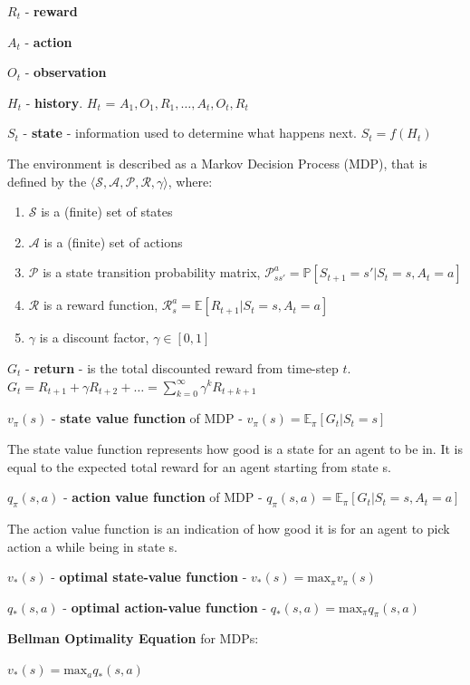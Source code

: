 $R_t$ - \textbf{reward}

$A_t$ - \textbf{action}

$O_t$ - \textbf{observation}

$H_t$ - \textbf{history}. $H_t$ = $A_1,O_1,R_1,\dots,A_t,O_t,R_t$

$S_t$ - \textbf{state} - information used to determine what happens next. $S_t = f(H_t)$

The environment is described as a Markov Decision Process (MDP), that is defined by the $\langle\mathcal{S},\mathcal{A},\mathcal{P},\mathcal{R},\gamma\rangle$, where:
\begin{enumerate}
    \item 
        $\mathcal{S}$ is a (finite) set of states
    \item 
        $\mathcal{A}$ is a (finite) set of actions
    \item
        $\mathcal{P}$ is a state transition probability matrix, $\mathcal{P}^a_{s s'}=\mathbb{P}[S_{t+1}=s'|S_t=s,A_t=a]$
    \item
        $\mathcal{R}$ is a reward function, $\mathcal{R}_s^a=\mathbb{E}[R_{t+1}|S_t=s, A_t=a]$
    \item
        $\gamma$ is a discount factor, $\gamma \in [0,1]$
\end{enumerate}

$G_t$ - \textbf{return} - is the total discounted reward from time-step $t$. $G_t=R_{t+1}+\gamma R_{t+2}+\dots=\sum_{k=0}^{\infty} \gamma^k R_{t+k+1}$

$v_\pi(s)$ - \textbf{state value function} of MDP - $v_\pi(s) = \mathbb{E}_\pi[G_t|S_t=s]$

The state value function represents how good is a state for an agent to be in. It is equal to the expected total reward for an agent starting from state s.
    
$q_\pi (s,a)$ - \textbf{action value function} of MDP - $q_\pi (s,a) = \mathbb{E}_\pi[G_t|S_t=s, A_t=a]$

The action value function is an indication of how good it is for an agent to pick action a while being in state s.

$v_*(s)$ - \textbf{optimal state-value function} - $v_*(s)=\text{max}_\pi v_\pi (s)$

$q_*(s,a)$ - \textbf{optimal action-value function} - $q_*(s,a)=\text{max}_\pi q_\pi (s,a)$


\textbf{Bellman Optimality Equation} for MDPs:

$v_*(s)=\text{max}_a q_* (s,a)$

